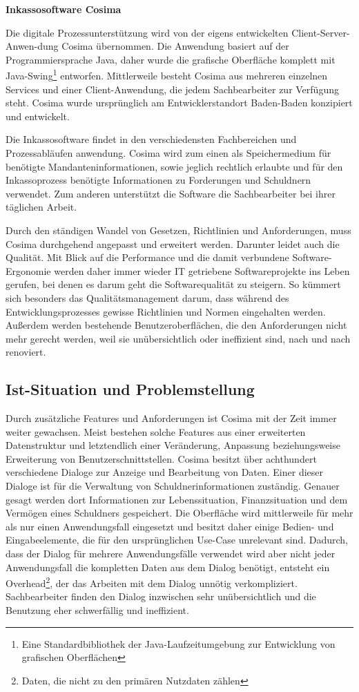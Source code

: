 \textbf{Inkassosoftware Cosima}

Die digitale Prozessunterstützung wird von der eigens entwickelten Client-Server-Anwen-dung Cosima übernommen. Die Anwendung basiert auf der Programmiersprache Java, daher wurde die grafische Oberfläche komplett mit Java-Swing\footnote{Eine Standardbibliothek der Java-Laufzeitumgebung zur Entwicklung von grafischen Oberflächen} entworfen. Mittlerweile besteht Cosima aus mehreren einzelnen Services und einer Client-Anwendung, die jedem Sachbearbeiter zur Verfügung steht. Cosima wurde ursprünglich am Entwicklerstandort Baden-Baden konzipiert und entwickelt.

Die Inkassosoftware findet in den verschiedensten Fachbereichen und Prozessabläufen anwendung. Cosima wird zum einen als Speichermedium für benötigte Mandanteninformationen, sowie jeglich rechtlich erlaubte und für den Inkassoprozess benötigte Informationen zu Forderungen und Schuldnern verwendet. Zum anderen unterstützt die Software die Sachbearbeiter bei ihrer täglichen Arbeit. 

Durch den ständigen Wandel von Gesetzen, Richtlinien und Anforderungen, muss Cosima durchgehend angepasst und erweitert werden. Darunter leidet auch die Qualität. Mit Blick auf die Performance und die damit verbundene Software-Ergonomie werden daher immer wieder IT getriebene Softwareprojekte ins Leben gerufen, bei denen es darum geht die Softwarequalität zu steigern. So kümmert sich besonders das Qualitätsmanagement darum, dass während des Entwicklungsprozesses gewisse Richtlinien und Normen eingehalten werden. Außerdem werden bestehende Benutzeroberflächen, die den Anforderungen nicht mehr gerecht werden, weil sie unübersichtlich oder ineffizient sind, nach und nach renoviert.


\subsection{Ist-Situation und Problemstellung}
Durch zusätzliche Features und Anforderungen ist Cosima mit der Zeit immer weiter gewachsen. Meist bestehen solche Features aus einer erweiterten Datenstruktur und letztendlich einer Veränderung, Anpassung beziehungsweise Erweiterung von Benutzerschnittstellen. Cosima besitzt über achthundert verschiedene Dialoge zur Anzeige und Bearbeitung von Daten. Einer dieser Dialoge ist für die Verwaltung von Schuldnerinformationen zuständig. Genauer gesagt werden dort Informationen zur Lebenssituation, Finanzsituation und dem Vermögen eines Schuldners gespeichert. Die Oberfläche wird mittlerweile für mehr als nur einen Anwendungsfall eingesetzt und besitzt daher einige Bedien- und Eingabeelemente, die für den ursprünglichen Use-Case unrelevant sind. Dadurch, dass der Dialog für mehrere Anwendungsfälle verwendet wird aber nicht jeder Anwendungsfall die kompletten Daten aus dem Dialog benötigt, entsteht ein Overhead\footnote{Daten, die nicht zu den primären Nutzdaten zählen}, der das Arbeiten mit dem Dialog unnötig verkompliziert. Sachbearbeiter finden den Dialog inzwischen sehr unübersichtlich und die Benutzung eher schwerfällig und ineffizient.

